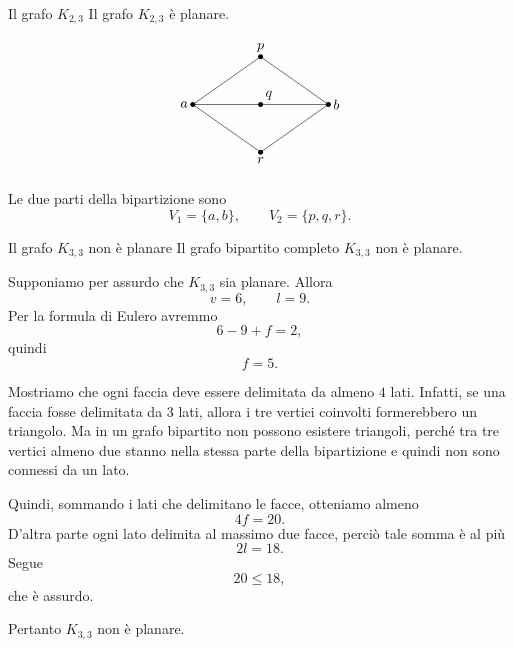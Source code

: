 \documentclass[a4paper]{article}
\begin{document}
\begin{snippetexample}{Il grafo \(K_{2,3}\)}
    Il grafo \(K_{2,3}\) è planare.

    \[
        \begin{tikzpicture}[scale=1]
            \coordinate (a) at (-1.7,0);
            \coordinate (b) at (1.7,0);
            \coordinate (p) at (0,1.2);
            \coordinate (q) at (0,0);
            \coordinate (r) at (0,-1.2);

            \draw (a)--(p)--(b);
            \draw (a)--(q)--(b);
            \draw (a)--(r)--(b);

            \foreach \x in {a,b,p,q,r}{
                \fill (\x) circle (1.8pt);
            }

            \node[left] at (a) {\(a\)};
            \node[right] at (b) {\(b\)};
            \node[above] at (p) {\(p\)};
            \node[above right] at (q) {\(q\)};
            \node[below] at (r) {\(r\)};
        \end{tikzpicture}
    \]

    Le due parti della bipartizione sono
    \[
        V_1=\{a,b\},
        \qquad
        V_2=\{p,q,r\}.
    \]
\end{snippetexample}

\begin{snippetproposition}{Il grafo \(K_{3,3}\) non è planare}
    Il grafo bipartito completo \(K_{3,3}\) non è planare.
\end{snippetproposition}

\begin{snippetproof}{}
    Supponiamo per assurdo che \(K_{3,3}\) sia planare. Allora
    \[
        v=6,
        \qquad
        l=9.
    \]
    Per la formula di Eulero avremmo
    \[
        6-9+f=2,
    \]
    quindi
    \[
        f=5.
    \]

    Mostriamo che ogni faccia deve essere delimitata da almeno \(4\) lati. Infatti, se una faccia fosse delimitata da \(3\) lati, allora i tre vertici coinvolti formerebbero un triangolo. Ma in un grafo bipartito non possono esistere triangoli, perché tra tre vertici almeno due stanno nella stessa parte della bipartizione e quindi non sono connessi da un lato.

    Quindi, sommando i lati che delimitano le facce, otteniamo almeno
    \[
        4f=20.
    \]
    D'altra parte ogni lato delimita al massimo due facce, perciò tale somma è al più
    \[
        2l=18.
    \]
    Segue
    \[
        20\leq 18,
    \]
    che è assurdo.

    Pertanto \(K_{3,3}\) non è planare.
\end{snippetproof}
\end{document}
